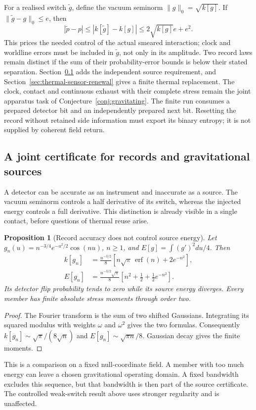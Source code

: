 \documentclass[12pt,a4paper]{article}
\newtheorem{proposition}[theorem]{Proposition}
\begin{document}
For a realised switch $\widetilde g$, define the vacuum seminorm
$\|g\|_0=\sqrt{k[g]}$. If $\|\widetilde g-g\|_0\le e$, then
\[
 |\widetilde p-p|\le |k[\widetilde g]-k[g]|
 \le 2\sqrt{k[g]}e+e^2.
\]
This prices the needed control of the actual smeared interaction; clock and
worldline errors must be included in $\widetilde g$, not only in its amplitude.
Two record laws remain distinct if the sum of their probability-error bounds
is below their stated separation. Section~\ref{sec:joint-source-certificate}
adds the independent source requirement, and
Section~\ref{sec:thermal-sensor-renewal} gives a finite thermal replacement.
The clock, contact and continuous exhaust with their complete stress remain
the joint apparatus task of Conjecture~\ref{conj:gravitating}.
The finite run consumes a prepared detector bit and an independently prepared
next bit. Resetting the record without retained side information must export
its binary entropy; it is not supplied by coherent field return.
\subsection{A joint certificate for records and gravitational sources}
\label{sec:joint-source-certificate}

A detector can be accurate as an instrument and inaccurate as a source.
The vacuum seminorm controls a half derivative of its switch, whereas the
injected energy controls a full derivative. This distinction is already
visible in a single contact, before questions of thermal reuse arise.

\begin{proposition}[Record accuracy does not control source energy]
\label{prop:record-source-gap}
Let $g_n(u)=n^{-3/4}e^{-u^2/2}\cos(nu)$, $n\ge1$, and
$E[g]=\int(g')^2du/4$. Then
\begin{align}
 k[g_n]&=\frac{n^{-3/2}}8
       [n\sqrt\pi\,\operatorname{erf}(n)+2e^{-n^2}],\nonumber\\
 E[g_n]&=\frac{n^{-3/2}\sqrt\pi}8
       [n^2+\tfrac12+\tfrac12e^{-n^2}].
 \label{eq:record-source-counterexample}
\end{align}
Its detector flip probability tends to zero while its source energy diverges.
Every member has finite absolute stress moments through order two.
\end{proposition}
\begin{proof}
The Fourier transform is the sum of two shifted Gaussians. Integrating its
squared modulus with weights $\omega$ and $\omega^2$ gives the two formulas.
Consequently $k[g_n]\sim\sqrt\pi/(8\sqrt n)$ and
$E[g_n]\sim\sqrt{\pi n}/8$. Gaussian decay gives the finite moments.
\end{proof}
This is a comparison on a fixed null-coordinate field. A member with too much
energy can leave a chosen gravitational operating domain. A fixed bandwidth
excludes this sequence, but that bandwidth is then part of the source
certificate. The controlled weak-switch result above uses stronger regularity
and is unaffected.
\end{document}
